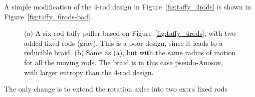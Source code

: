 \documentclass[12pt]{article}
\begin{document}
A simple modification of the 4-rod design in Figure~\ref{fig:taffy_4rods} is
shown in Figure~\ref{fig:taffy_6rods-bad}.
%
\begin{figure}
\begin{center}
\hspace{1em}
\end{center}
\caption{(a) A six-rod taffy puller based on Figure~\ref{fig:taffy_4rods},
  with two added fixed rods (gray).  This is a poor design, since it leads to
  a reducible braid. %
  (b) Same as (a), but with the same radius of motion for all the moving rods.
  The braid is in this case pseudo-Anosov, with larger entropy than the 4-rod
  design.}
\label{fig:taffy_6rods-improved}
\end{figure}
%
The only change is to extend the rotation axles into two extra fixed rods
\end{document}
